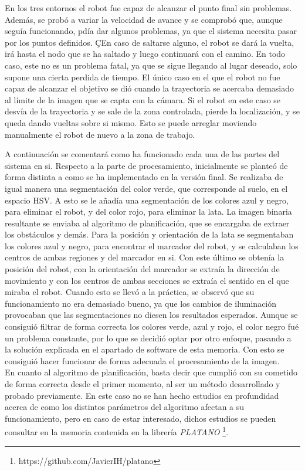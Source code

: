 En los tres entornos el robot fue capaz de alcanzar el punto final sin problemas. Además, se probó a variar la velocidad de avance y se comprobó que, aunque seguía funcionando, pdía dar algunos problemas, ya que el sistema necesita pasar por los puntos definidos. ÇEn caso de saltarse alguno, el robot se dará la vuelta, irá hasta el nodo que se ha saltado y luego continuará con el camino. En todo caso, este no es un problema fatal, ya que se sigue llegando al lugar deseado, solo supone una cierta perdida de tiempo. El único caso en el que el robot no fue capaz de alcanzar el objetivo se dió cuando la trayectoria se acercaba demasiado al límite de la imagen que se capta con la cámara. Si el robot en este caso se desvía de la trayectoria y se sale de la zona controlada, pierde la localización, y se queda dando vueltas sobre si mismo. Esto se puede arreglar moviendo manualmente el robot de nuevo a la zona de trabajo.

A continuación se comentará como ha funcionado cada una de las partes del sistema en si. Respecto a la parte de procesamiento, inicialmente se planteó de forma distinta a como se ha implementado en la versión final. Se realizaba de igual manera una segmentación del color verde, que corresponde al suelo, en el espacio HSV. A esto se le añadía una segmentación de los colores azul y negro, para eliminar el robot, y del color rojo, para eliminar la lata. La imagen binaria resultante se enviaba al algoritmo de planificación, que se encargaba de extraer los obstáculos y demás. Para la posición y orientación de la lata se segmentaban los colores azul y negro, para encontrar el marcador del robot, y se calculaban los centros de ambas regiones y del marcador en si. Con este último se obtenía la posición del robot, con la orientación del marcador se extraía la dirección de movimiento y con los centros de ambas secciones se extraía el sentido en el que miraba el robot. Cuando esto se llevó a la práctica, se observó que su funcionamiento no era demasiado bueno, ya que los cambios de iluminación provocaban que las segmentaciones no diesen los resultados esperados. Aunque se consiguió filtrar de forma correcta los colores verde, azul y rojo, el color negro fué un problema constante, por lo que se decidió optar por otro enfoque, pasando a la solución explicada en el apartado de software de esta memoria. Con esto se consiguió hacer funcionar de forma adecuada el procesamiento de la imagen.\\

En cuanto al algoritmo de planificación, basta decir que cumplió con su cometido de forma correcta desde el primer momento, al ser un método desarrollado y probado previamente. En este caso no se han hecho estudios en profundidad acerca de como los distintos parámetros del algoritmo afectan a su funcionamiento, pero en caso de estar interesado, dichos estudios se pueden consultar en la memoria contenida en la librería  \textit{PLATANO} \footnote{https://github.com/JavierIH/platano}.\\

